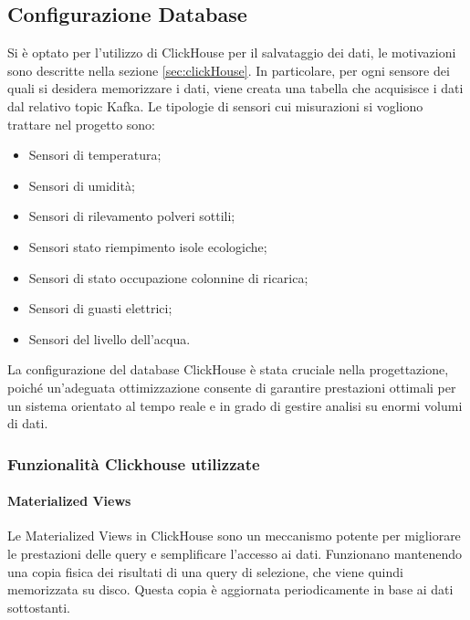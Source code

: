 
\subsection{Configurazione Database}
Si è optato per l'utilizzo di ClickHouse per il salvataggio dei dati, le motivazioni sono descritte nella sezione \ref{sec:clickHouse}. In particolare, per ogni sensore dei quali si desidera memorizzare i dati, viene creata una tabella che acquisisce i dati dal relativo topic Kafka.
Le tipologie di sensori cui misurazioni si vogliono trattare nel progetto sono:
\begin{itemize}
    \item Sensori di temperatura;
    \item Sensori di umidità;
    \item Sensori di rilevamento polveri sottili; 
    \item Sensori stato riempimento isole ecologiche;
    \item Sensori di stato occupazione colonnine di ricarica;
    \item Sensori di guasti elettrici;
    \item Sensori del livello dell'acqua.
\end{itemize}

La configurazione del database ClickHouse è stata cruciale nella progettazione, poiché un'adeguata ottimizzazione consente di garantire prestazioni ottimali per un sistema orientato al tempo reale e in grado di gestire analisi su enormi volumi di dati.


\subsubsection{Funzionalità Clickhouse utilizzate}
\paragraph{Materialized Views}
Le Materialized Views in ClickHouse sono un meccanismo potente per migliorare le prestazioni delle query e semplificare l'accesso ai dati. Funzionano mantenendo una copia fisica dei risultati di una query di selezione, che viene quindi memorizzata su disco. Questa copia è aggiornata periodicamente in base ai dati sottostanti.

